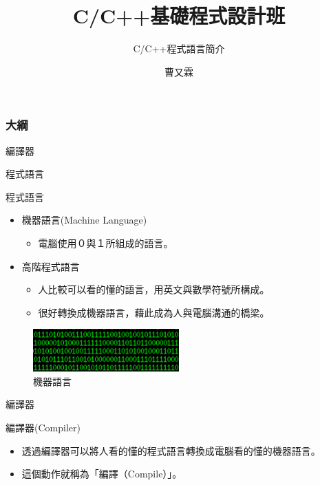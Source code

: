 \documentclass[pdf,15pt]{beamer}
\title{C/C++基礎程式設計班}
\subtitle{C/C++程式語言簡介}
\author{曹又霖}
\begin{document}
\begin{frame}
	\titlepage
\end{frame}

\begin{frame}
\frametitle{大綱} %
\tableofcontents %
\end{frame}

\begin{section}{編譯器}
\begin{subsection}{程式語言}
\begin{frame}{程式語言}
	\begin{itemize}
	\item 機器語言(Machine Language)
		\begin{itemize}
		\item 電腦使用０與１所組成的語言。
		\end{itemize}
	\item 高階程式語言
		\begin{itemize}
		\item 人比較可以看的懂的語言，用英文與數學符號所構成。
		\item 很好轉換成機器語言，藉此成為人與電腦溝通的橋梁。
		\end{itemize}
	\end{itemize}
	\begin{figure}[h!]
		\includegraphics[width=0.5\textwidth]{image/00-01.png} 
		\caption{機器語言}
	\end{figure}
\end{frame}
\end{subsection}

\begin{subsection}{編譯器}
\begin{frame}{編譯器(Compiler)}
	\begin{itemize}
		\item 透過編譯器可以將人看的懂的程式語言轉換成電腦看的懂的機器語言。
		\item 這個動作就稱為「編譯（Compile）」。
	\end{itemize}
	
\end{frame}
\end{subsection}


\end{section}
\end{document}
